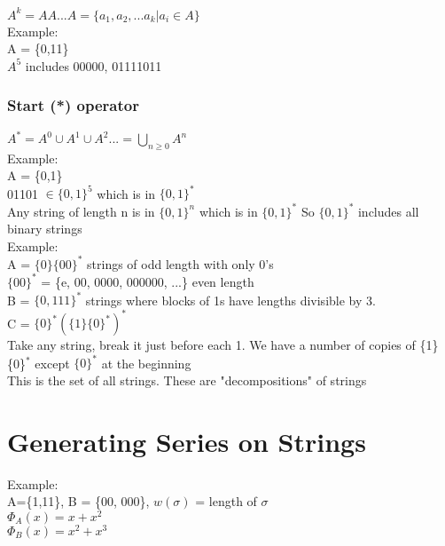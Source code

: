 \documentclass[12pt]{article}
\begin{document}
	$A^k = AA...A = \{a_1, a_2, ...a_k | a_i \in A\}$\\
	Example:\\
	A = \{0,11\}\\
	$A^5$ includes 00000, 01111011\\
	
	\subsubsection*{Start (*) operator}
	
	$A^* = A^0 \cup A^1 \cup A^2 ... = \bigcup_{n\geq 0}A^n$\\
	
	Example:\\
	A = \{0,1\}\\
	01101 $\in \{0,1\}^5$ which is in $\{0,1\}^*$\\
	
	Any string of length n is in $\{0,1\}^n$ which is in $\{0,1\}^*$ So $\{0,1\}^*$ includes all binary strings\\
	
	Example: \\
	A = $\{0\}\{00\}^*$ strings of odd length with only 0's\\
	$\{00\}^*$ = \{e, 00, 0000, 000000, ...\} even length\\
	
	B = $\{0,111\}^*$ strings where blocks of 1s have lengths divisible by 3.\\
	
	C = $\{0\}^*(\{1\}\{0\}^*)^*$\\
	Take any string, break it just before each 1. We have a number of copies of \{1\}\{0\}$^*$ except $\{0\}^*$ at the beginning\\
	
	This is the set of all strings. These are "decompositions" of strings\\
	
	\section*{Generating Series on Strings}
	
	Example:\\
	A=\{1,11\}, B = \{00, 000\}, $w(\sigma)$ = length of $\sigma$\\
	
	$\Phi_A(x) = x + x^2$\\
	$\Phi_B(x) = x^2 + x^3$\\
	
\end{document}
